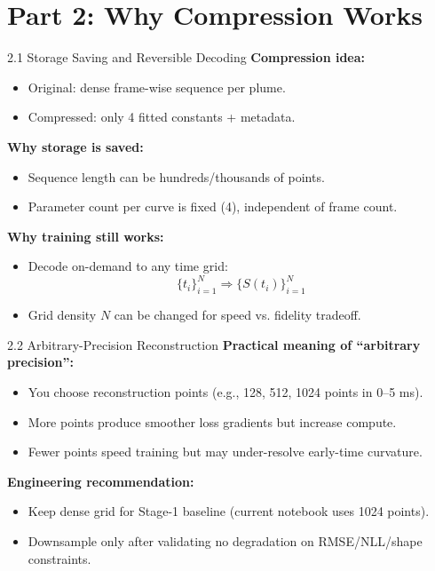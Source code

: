 \documentclass[UTF8,aspectratio=169]{ctexbeamer}
\begin{document}
\section{Part 2: Why Compression Works}

\begin{frame}{2.1 Storage Saving and Reversible Decoding}
\textbf{Compression idea:}
\begin{itemize}
  \item Original: dense frame-wise sequence per plume.
  \item Compressed: only 4 fitted constants + metadata.
\end{itemize}

\vspace{0.3em}
\textbf{Why storage is saved:}
\begin{itemize}
  \item Sequence length can be hundreds/thousands of points.
  \item Parameter count per curve is fixed (4), independent of frame count.
\end{itemize}

\vspace{0.3em}
\textbf{Why training still works:}
\begin{itemize}
  \item Decode on-demand to any time grid:
  \[
  \{t_i\}_{i=1}^N \Rightarrow \{S(t_i)\}_{i=1}^N
  \]
  \item Grid density $N$ can be changed for speed vs. fidelity tradeoff.
\end{itemize}
\end{frame}

\begin{frame}{2.2 Arbitrary-Precision Reconstruction}
\textbf{Practical meaning of ``arbitrary precision'':}
\begin{itemize}
  \item You choose reconstruction points (e.g., 128, 512, 1024 points in 0--5 ms).
  \item More points produce smoother loss gradients but increase compute.
  \item Fewer points speed training but may under-resolve early-time curvature.
\end{itemize}

\vspace{0.3em}
\textbf{Engineering recommendation:}
\begin{itemize}
  \item Keep dense grid for Stage-1 baseline (current notebook uses 1024 points).
  \item Downsample only after validating no degradation on RMSE/NLL/shape constraints.
\end{itemize}
\end{frame}
\end{document}
